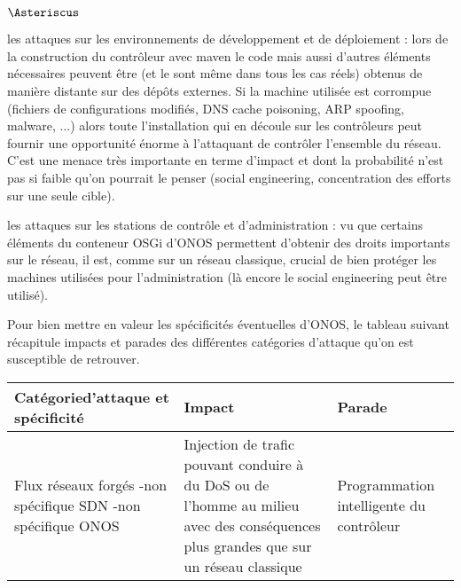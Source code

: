 \begin{list}{$\Asteriscus$}{}
\item les attaques sur les environnements de développement et de déploiement : lors de la construction du contrôleur avec maven le code mais aussi d'autres éléments nécessaires peuvent être (et le sont même dans tous les cas réels) obtenus de manière distante sur des dépôts externes. Si la machine utilisée est corrompue (fichiers de configurations modifiés, DNS cache poisoning, ARP spoofing, malware, ...) alors toute l'installation qui en découle sur les contrôleurs peut fournir une opportunité énorme à l'attaquant de contrôler l'ensemble du réseau. C'est une menace très importante en terme d'impact et dont la probabilité n'est pas si faible qu'on pourrait le penser (social engineering, concentration des efforts sur une seule cible).

\item les attaques sur les stations de contrôle et d'administration : vu que certains éléments du conteneur OSGi d'ONOS permettent d'obtenir des droits importants sur le réseau, il est, comme sur un réseau classique, crucial de bien protéger les machines utilisées pour l'administration (là encore le social engineering peut être utilisé).

\end{list}

Pour bien mettre en valeur les spécificités éventuelles d'ONOS, le tableau suivant récapitule impacts et parades des différentes catégories d'attaque qu'on est susceptible de retrouver.

\begin{small}

\begin{tabularx}{\textwidth}{|X|X|X|}

\hline
Catégorie\newline d'attaque et spécificité & Impact & Parade\\
\hline
Flux réseaux forgés \newline -non spécifique SDN \newline -non spécifique ONOS & Injection de trafic pouvant conduire à du DoS ou de l'homme au milieu avec des conséquences plus grandes que sur un réseau classique & Programmation intelligente du contrôleur\\ 
\hline 

\end{tabularx}

\end{small}